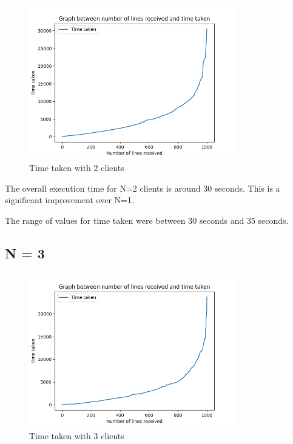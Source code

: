 \documentclass[12pt]{scrartcl}
\begin{document}
\begin{figure}[H]
    \centering
    \includegraphics[width=0.8\textwidth]{images/latency_n_2.png}
    \caption{Time taken with 2 clients}
    \label{fig:my_label}
\end{figure}

The overall execution time for N=2 clients is around 30 seconds. This is a significant improvement over N=1. 

The range of values for time taken were between 30 seconds and 35 seconds.

\subsection{N = 3}

\begin{figure}[H]
    \centering
    \includegraphics[width=0.8\textwidth]{images/latency_n_3.png}
    \caption{Time taken with 3 clients}
    \label{fig:my_label}
\end{figure}
\end{document}
